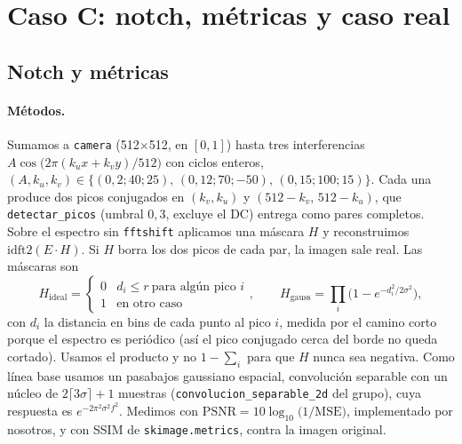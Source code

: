 %

\section{Caso C: notch, métricas y caso real}
\label{sec:notch}

\subsection{Notch y métricas}
\label{sec:notch-metricas}

\paragraph{Métodos.}
Sumamos a \texttt{camera} (512$\times$512, en $[0,1]$) hasta tres interferencias
$A\cos\!\big(2\pi(k_u x+k_v y)/512\big)$ con ciclos enteros, $(A,k_u,k_v)\in\{(0{,}2;40;25),\,
(0{,}12;70;-50),\,(0{,}15;100;15)\}$. Cada una produce dos picos conjugados en $(k_v,k_u)$ y
$(512-k_v,\,512-k_u)$, que \texttt{detectar\_picos} (umbral $0{,}3$, excluye el DC) entrega como pares
completos. Sobre el espectro sin \texttt{fftshift} aplicamos una máscara $H$ y reconstruimos
$\mathrm{idft2}(E\cdot H)$. Si $H$ borra los dos picos de cada par, la imagen sale real.
Las máscaras son
\begin{equation}
  H_{\text{ideal}}=\begin{cases}0 & d_i\le r\ \text{para algún pico }i\\ 1 & \text{en otro caso}\end{cases},
  \qquad
  H_{\text{gauss}}=\prod_i\Big(1-e^{-d_i^2/2\sigma^2}\Big),
  \label{eq:notch}
\end{equation}
con $d_i$ la distancia en bins de cada punto al pico $i$, medida por el camino corto porque el
espectro es periódico (así el pico conjugado cerca del borde no queda cortado). Usamos el
producto y no $1-\sum_i$ para que $H$ nunca sea negativa. Como línea base usamos un pasabajos
gaussiano espacial, convolución separable con un núcleo de $2\lceil3\sigma\rceil+1$ muestras
(\texttt{convolucion\_separable\_2d} del grupo), cuya respuesta es
$e^{-2\pi^2\sigma^2 f^2}$. Medimos con
$\mathrm{PSNR}=10\log_{10}\!\big(1/\mathrm{MSE}\big)$, implementado por nosotros, y con
SSIM de \texttt{skimage.metrics}, contra la imagen original.

